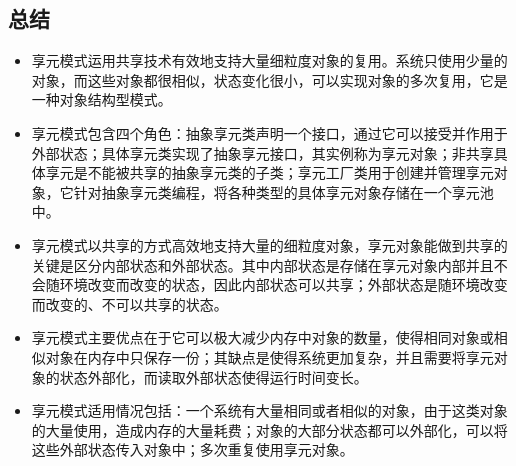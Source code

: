 \documentclass[letterpaper,10pt,english]{sphinxmanual}
\begin{document}
\subsection{总结}
\label{\detokenize{structural_patterns/flyweight:id15}}\begin{itemize}
\item {} 
\sphinxAtStartPar
享元模式运用共享技术有效地支持大量细粒度对象的复用。系统只使用少量的对象，而这些对象都很相似，状态变化很小，可以实现对象的多次复用，它是一种对象结构型模式。

\item {} 
\sphinxAtStartPar
享元模式包含四个角色：抽象享元类声明一个接口，通过它可以接受并作用于外部状态；具体享元类实现了抽象享元接口，其实例称为享元对象；非共享具体享元是不能被共享的抽象享元类的子类；享元工厂类用于创建并管理享元对象，它针对抽象享元类编程，将各种类型的具体享元对象存储在一个享元池中。

\item {} 
\sphinxAtStartPar
享元模式以共享的方式高效地支持大量的细粒度对象，享元对象能做到共享的关键是区分内部状态和外部状态。其中内部状态是存储在享元对象内部并且不会随环境改变而改变的状态，因此内部状态可以共享；外部状态是随环境改变而改变的、不可以共享的状态。

\item {} 
\sphinxAtStartPar
享元模式主要优点在于它可以极大减少内存中对象的数量，使得相同对象或相似对象在内存中只保存一份；其缺点是使得系统更加复杂，并且需要将享元对象的状态外部化，而读取外部状态使得运行时间变长。

\item {} 
\sphinxAtStartPar
享元模式适用情况包括：一个系统有大量相同或者相似的对象，由于这类对象的大量使用，造成内存的大量耗费；对象的大部分状态都可以外部化，可以将这些外部状态传入对象中；多次重复使用享元对象。

\end{itemize}

\sphinxstepscope
\end{document}
